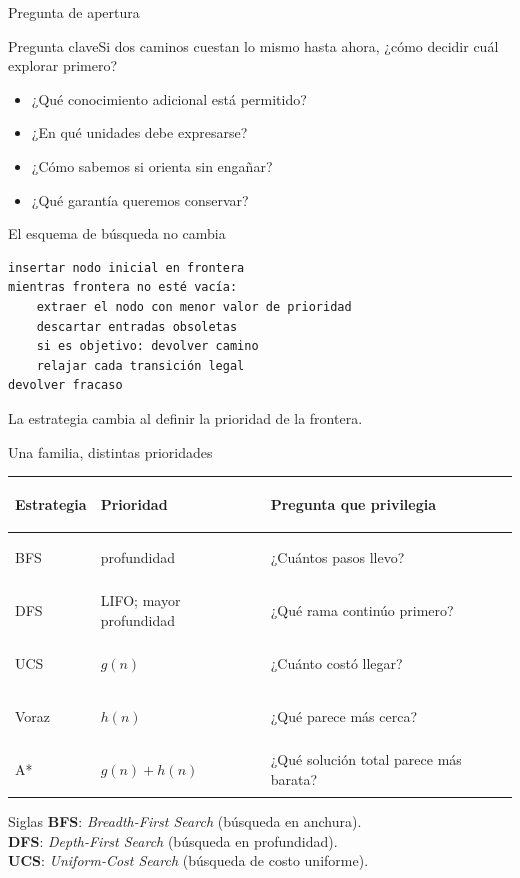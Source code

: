 \documentclass[aspectratio=169,11pt]{beamer}
\newcommand{\pregunta}[1]{\begin{block}{Pregunta clave}#1\end{block}}
\begin{document}
\begin{frame}{Pregunta de apertura}
  \pregunta{Si dos caminos cuestan lo mismo hasta ahora, ¿cómo decidir cuál explorar primero?}
  \begin{itemize}
    \item ¿Qué conocimiento adicional está permitido?
    \item ¿En qué unidades debe expresarse?
    \item ¿Cómo sabemos si orienta sin engañar?
    \item ¿Qué garantía queremos conservar?
  \end{itemize}
\end{frame}

\begin{frame}[fragile]{El esquema de búsqueda no cambia}
\small
\begin{verbatim}
insertar nodo inicial en frontera
mientras frontera no esté vacía:
    extraer el nodo con menor valor de prioridad
    descartar entradas obsoletas
    si es objetivo: devolver camino
    relajar cada transición legal
devolver fracaso
\end{verbatim}
  \alert{La estrategia cambia al definir la prioridad de la frontera.}
\end{frame}

\begin{frame}{Una familia, distintas prioridades}
  \small
  \begin{tabularx}{\textwidth}{>{\bfseries\raggedright\arraybackslash}p{}>{\raggedright\arraybackslash}p{}X}
    \toprule
    Estrategia & Prioridad & Pregunta que privilegia \\\midrule
    BFS & profundidad & ¿Cuántos pasos llevo? \\
    DFS & LIFO; mayor profundidad & ¿Qué rama continúo primero? \\
    UCS & $g(n)$ & ¿Cuánto costó llegar? \\
    Voraz & $h(n)$ & ¿Qué parece más cerca? \\
    A* & $g(n)+h(n)$ & ¿Qué solución total parece más barata? \\
    \bottomrule
  \end{tabularx}
  \vspace{.5em}
  \begin{block}{Siglas}
    \scriptsize
    \textbf{BFS}: \emph{Breadth-First Search} (búsqueda en anchura).\\
    \textbf{DFS}: \emph{Depth-First Search} (búsqueda en profundidad).\\
    \textbf{UCS}: \emph{Uniform-Cost Search} (búsqueda de costo uniforme).
  \end{block}
\end{frame}
\end{document}
